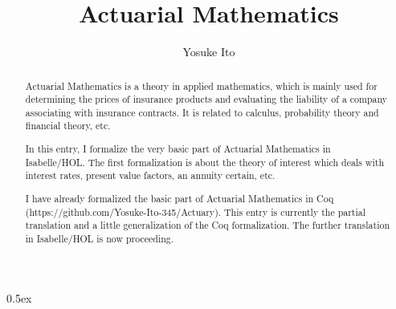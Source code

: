 \documentclass[11pt,a4paper]{article}
\begin{document}
\title{Actuarial Mathematics}
\author{Yosuke Ito}
\maketitle

\begin{abstract}
  Actuarial Mathematics is a theory in applied mathematics,
  which is mainly used for determining the prices of insurance products
  and evaluating the liability of a company associating with insurance contracts.
  It is related to calculus, probability theory and financial theory, etc.

  In this entry, I formalize the very basic part of Actuarial Mathematics in Isabelle/HOL.
  The first formalization is about the theory of interest
  which deals with interest rates, present value factors, an annuity certain, etc.

  I have already formalized the basic part of Actuarial Mathematics in Coq
  (https://github.com/Yosuke-Ito-345/Actuary).
  This entry is currently the partial translation and
  a little generalization of the Coq formalization.
  The further translation in Isabelle/HOL is now proceeding.
\end{abstract}

\tableofcontents

\parindent 0pt\parskip 0.5ex



%
%
\end{document}
